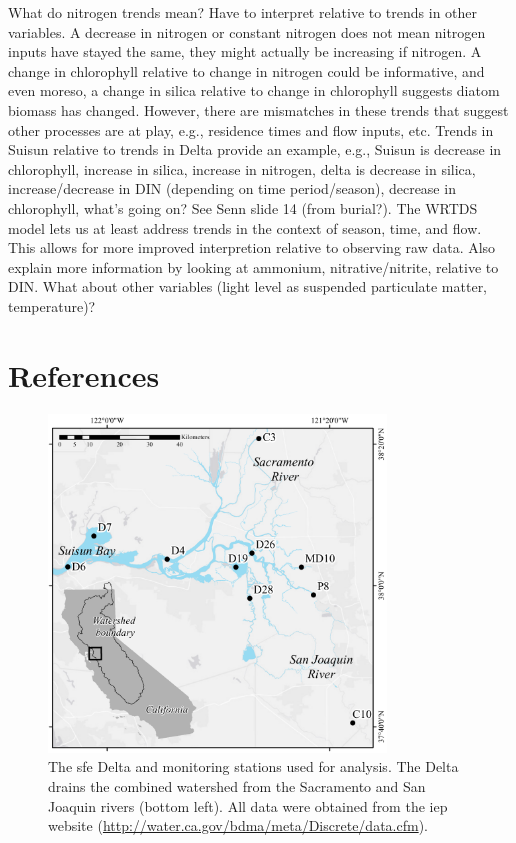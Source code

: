 \documentclass[journal = esthag, manuscript = article]{achemso}\usepackage[]{graphicx}\usepackage[]{color}
\begin{document}
What do nitrogen trends mean?  Have to interpret relative to trends in other variables.  A decrease in nitrogen or constant nitrogen does not mean nitrogen inputs have stayed the same, they might actually be increasing if nitrogen.  A change in chlorophyll relative to change in nitrogen could be informative, and even moreso, a change in silica relative to change in chlorophyll suggests diatom biomass has changed.  However, there are mismatches in these trends that suggest other processes are at play, e.g., residence times and flow inputs, etc.  Trends in Suisun relative to trends in Delta provide an example, e.g., Suisun is decrease in chlorophyll, increase in silica, increase in nitrogen, delta is decrease in silica, increase/decrease in DIN (depending on time period/season), decrease in chlorophyll, what's going on? See Senn slide 14 (from burial?). The WRTDS model lets us at least address trends in the context of season, time, and flow.  This allows for more improved interpretion relative to observing raw data. Also explain more information by looking at ammonium, nitrative/nitrite, relative to DIN. What about other variables (light level as suspended particulate matter, temperature)?


\section{References} %
\begin{singlespace}

\end{singlespace}

\begin{figure}
\centering
\includegraphics[width=0.8\textwidth,page=1]{figs/delt_map.pdf}
\caption{The \acl{sfe} Delta and monitoring stations used for analysis. The Delta drains the combined watershed from the Sacramento and San Joaquin rivers (bottom left). All data were obtained from the \acl{iep} website (\url{http://water.ca.gov/bdma/meta/Discrete/data.cfm})\cite{IEP13}.}
\label{fig:delt_map}   
\end{figure}
\end{document}
